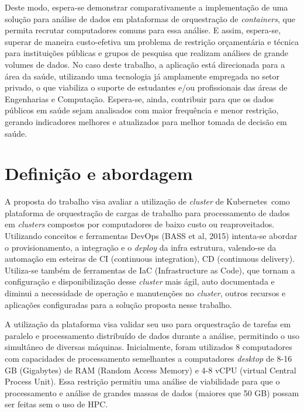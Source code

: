 Deste modo, espera-se demonstrar comparativamente a implementação de uma solução para análise de dados em plataformas de orquestração de \emph{containers}, que permita recrutar computadores comuns para essa análise. E assim, espera-se, superar de maneira custo-efetiva um problema de restrição orçamentária e técnica para instituições públicas e grupos de pesquisa que realizam análises de grande volumes de dados. No caso deste trabalho, a aplicação está direcionada para a área da saúde, utilizando uma tecnologia já amplamente empregada no setor privado, o que viabiliza o suporte de estudantes e/ou profissionais das áreas de Engenharias e Computação. Espera-se, ainda, contribuir para que os dados públicos em saúde sejam analisados com  maior frequência e menor restrição, gerando indicadores melhores e atualizados para melhor tomada de decisão em saúde.

\section{Definição e abordagem}
\label{sec:abordagem}

A proposta do trabalho visa avaliar a utilização de \emph{cluster} de Kubernetes\textregistered \ como plataforma de orquestração de cargas de trabalho para processamento de dados em \emph{clusters }compostos por computadores de baixo custo ou reaproveitados.  Utilizando conceitos e ferramentas DevOps (BASS et al, 2015) intenta-se abordar o provisionamento, a integração e o \emph{deploy} da infra estrutura, valendo-se da automação em esteiras de CI (continuous integration), CD (continuous delivery). Utiliza-se também de ferramentas de IaC (Infrastructure as Code), que tornam a configuração e disponibilização desse \emph{cluster} mais ágil, auto documentada e diminui a necessidade de operação e manutenções no \emph{cluster},  outros recursos e aplicações configuradas para a solução proposta nesse trabalho.

A utilização da plataforma visa validar seu uso para orquestração de tarefas em paralelo e processamento distribuído de dados durante a análise, permitindo o uso simultâneo de diversas máquinas. Inicialmente, foram utilizados 8 computadores com capacidades de processamento semelhantes a computadores \emph{desktop} de 8-16 GB (Gigabytes) de RAM (Random Access Memory) e 4-8 vCPU (virtual Central Process Unit). Essa restrição  permitiu uma análise de viabilidade para que o processamento e análise de grandes massas de dados (maiores que 50 GB) possam ser feitas sem o uso de HPC.

